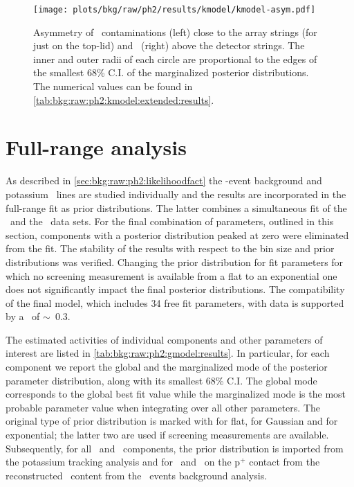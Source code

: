 \begin{figure}
  \centering
  \texttt{[image: plots/bkg/raw/ph2/results/kmodel/kmodel-asym.pdf]}
  \caption{%
    Asymmetry of \kvn\ contaminations (left) close to the array strings (for  just
    on the top-lid) and \kvz\ (right) above the detector strings. The inner and outer
    radii of each circle are proportional to the edges of the smallest 68\% C.I. of the
    marginalized posterior distributions. The numerical values can be found in
    \cref{tab:bkg:raw:ph2:kmodel:extended:results}. 
  }\label{fig:bkg:raw:ph2:kmodel:extended:strings}
\end{figure}

\section{Full-range analysis}%
\label{sec:bkg:raw:ph2:gmodel}

As described in \cref{sec:bkg:raw:ph2:likelihoodfact} the \a-event background and
potassium \g\ lines are studied individually and the results are incorporated in the
full-range fit as prior distributions.  The latter combines a simultaneous fit of the
\Mone\ and the \Mtwo\ data sets. For the final combination of parameters, outlined in this
section, components with a posterior distribution peaked at zero were eliminated from the
fit. The stability of the results with respect to the bin size and prior distributions was
verified. Changing the prior distribution for fit parameters for which no screening
measurement is available from a flat to an exponential one does not significantly impact
the final posterior distributions. The compatibility of the final model, which includes 34
free fit parameters, with data is supported by a \pvalue\ of $\sim$~0.3.

The estimated activities of individual components and other parameters of interest are
listed in \cref{tab:bkg:raw:ph2:gmodel:results}. In particular, for each component we
report the global and the marginalized mode of the posterior parameter distribution, along
with its smallest 68\% C.I. The global mode corresponds to the global best fit value while
the marginalized mode is the most probable parameter value when integrating over all other
parameters. The original type of prior distribution is marked with \m{[f]} for flat,
\m{[g]} for Gaussian and \m{[e]} for exponential; the latter two are used if screening
measurements are available. Subsequently, for all \kvn\ and \kvz\ components, the prior
distribution is imported from the potassium tracking analysis and for \Pbh\ and \Bih\ on
the p$^+$ contact from the reconstructed \Ra\ content from the \a\ events background
analysis.

